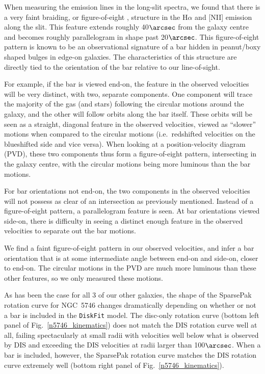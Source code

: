 \documentclass[a4paper,fleqn,usenatbib]{mnras}
\begin{document}
When measuring the emission lines in the long-slit spectra, we found that there is a very faint braiding, or figure-of-eight \citep{kuijken1995,kuzio2009}, structure in the H$\alpha$ and [NII] emission along the slit. This feature extends roughly 40$\arcsec$ from the galaxy centre and becomes roughly parallelogram in shape past 20$\arcsec$. This figure-of-eight pattern is known to be an observational signature of a bar hidden in peanut/boxy shaped bulges in edge-on galaxies. The characteristics of this structure are directly tied to the orientation of the bar relative to our line-of-sight. 

For example, if the bar is viewed end-on, the feature in the observed velocities will be very distinct, with two, separate components. One component will trace the majority of the gas (and stars) following the circular motions around the galaxy, and the other will follow orbits along the bar itself. These orbits will be seen as a straight, diagonal feature in the observed velocities, viewed as ``slower'' motions when compared to the circular motions (i.e.\ redshifted velocities on the blueshifted side and vice versa). When looking at a position-velocity diagram (PVD), these two components thus form a figure-of-eight pattern, intersecting in the galaxy centre, with the circular motions being more luminous than the bar motions.

For bar orientations not end-on, the two components in the observed velocities will not possess as clear of an intersection as previously mentioned. Instead of a figure-of-eight pattern, a parallelogram feature is seen. At bar orientations viewed side-on, there is difficulty in seeing a distinct enough feature in the observed velocities to separate out the bar motions.

We find a faint figure-of-eight pattern in our observed velocities, and infer a bar orientation that is at some intermediate angle between end-on and side-on, closer to end-on. The circular motions in the PVD are much more luminous than these other features, so we only measured these motions.

As has been the case for all 3 of our other galaxies, the shape of the SparsePak rotation curve for NGC~5746 changes dramatically depending on whether or not a bar is included in the \texttt{DiskFit} model. The disc-only rotation curve (bottom left panel of Fig.~\ref{n5746_kinematics}) does not match the DIS rotation curve well at all, failing spectacularly at small radii with velocities well below what is observed by DIS and exceeding the DIS velocities at radii larger than 100$\arcsec$. When a bar is included, however, the SparsePak rotation curve matches the DIS rotation curve extremely well (bottom right panel of Fig.~\ref{n5746_kinematics}). 
\end{document}
